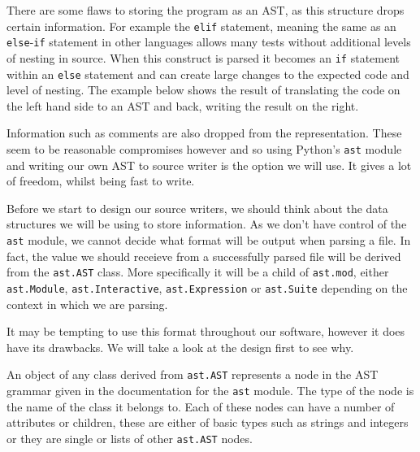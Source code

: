 \documentclass{report}
\begin{document}
There are some flaws to storing the program as an AST, as this structure drops certain information.
For example the \texttt{elif} statement, meaning the same as an \texttt{else}-\texttt{if} statement in other languages allows many tests without
additional levels of nesting in source. When this construct is parsed it becomes an \texttt{if} statement within an \texttt{else} statement and
can create large changes to the expected code and level of nesting. The example below shows the result of translating the code on the left hand
side to an AST and back, writing the result on the right.

\begin{minipage}[b]{0.4\linewidth}
\centering

\end{minipage}
\hspace{1cm}
\begin{minipage}[b]{0.5\linewidth}
\centering

\end{minipage}

Information such as comments are also dropped from the representation. These seem to be reasonable compromises however and so
using Python's \texttt{ast} module and writing our own AST to source writer is the option we will use. It gives a lot of freedom, whilst
being fast to write.

Before we start to design our source writers, we should think about the data structures we will be using to store information. As we don't have
control of the \texttt{ast} module, we cannot decide what format will be output when parsing a file. In fact, the value we should receieve from
a successfully parsed file will be derived from the \texttt{ast.AST} class. More specifically it will be a child of \texttt{ast.mod}, either
\texttt{ast.Module}, \texttt{ast.Interactive}, \texttt{ast.Expression} or \texttt{ast.Suite} depending on the context in which we are parsing.

It may be tempting to use this format throughout our software, however it does have its drawbacks. We will take a look at the design first to see why.

An object of any class derived from \texttt{ast.AST} represents a node in the AST grammar given in the documentation for the \texttt{ast} module. The
type of the node is the name of the class it belongs to. Each of these nodes can have a number of attributes or children, these are either of basic
types such as strings and integers or they are single or lists of other \texttt{ast.AST} nodes.
\end{document}
